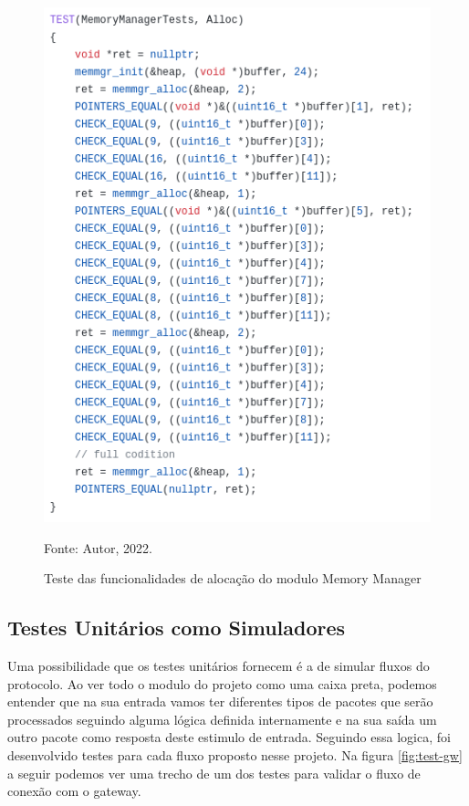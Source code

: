\begin{figure}[H]
    \centering
	\caption{Teste das funcionalidades de alocação do modulo Memory Manager}
    \includegraphics[height=0.62\textheight,keepaspectratio]{img/test-memmgr.png}
    \label{fig:test-memmgr}
    
    Fonte: Autor, 2022.
\end{figure}

\subsection{Testes Unitários como Simuladores}

Uma possibilidade que os testes unitários fornecem é a de simular fluxos do protocolo.
Ao ver todo o modulo do projeto como uma caixa preta, podemos entender que na
sua entrada vamos ter diferentes tipos de pacotes que serão processados seguindo
alguma lógica definida internamente e na sua saída um outro pacote como resposta deste
estimulo de entrada. Seguindo essa logica, foi desenvolvido testes para cada fluxo
proposto nesse projeto. Na figura \ref{fig:test-gw} a seguir podemos ver uma trecho
de um dos testes para validar o fluxo de conexão com o gateway.


